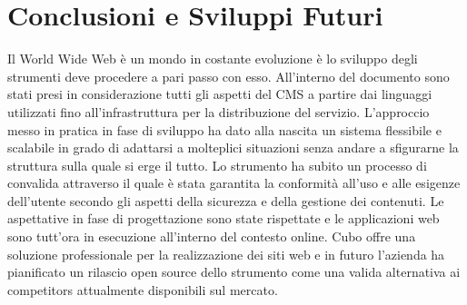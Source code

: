 \chapter{Conclusioni e Sviluppi Futuri}
\label{chap:Conclusioni}

Il World Wide Web è un mondo in costante evoluzione è lo sviluppo degli strumenti deve procedere a pari passo con esso. All'interno del documento sono stati presi in considerazione tutti gli aspetti del CMS a partire dai linguaggi utilizzati fino all'infrastruttura per la distribuzione del servizio. L'approccio messo in pratica in fase di sviluppo ha dato alla nascita un sistema flessibile e scalabile in grado di adattarsi a molteplici situazioni senza andare a sfigurarne la struttura sulla quale si erge il tutto. Lo strumento ha subito un processo di convalida attraverso il quale è stata garantita la conformità all'uso e alle esigenze dell'utente secondo gli aspetti della sicurezza e della gestione dei contenuti.
Le aspettative in fase di progettazione sono state rispettate e le applicazioni web sono tutt'ora in esecuzione all'interno del contesto online. Cubo offre una soluzione professionale per la realizzazione dei siti web e in futuro l'azienda ha pianificato un rilascio open source dello strumento come una valida alternativa ai competitors attualmente disponibili sul mercato.